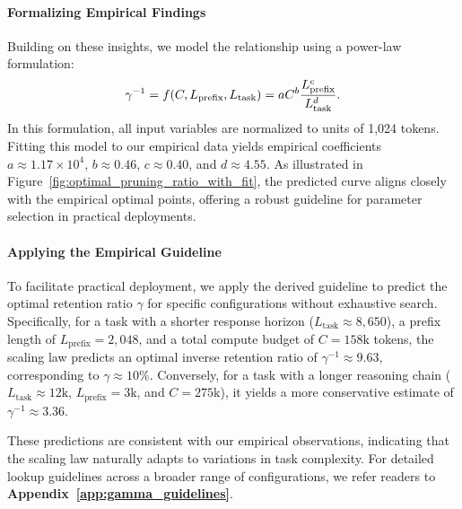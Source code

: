 \documentclass[11pt]{article}
\theoremstyle{plain}
\begin{document}
\paragraph{Formalizing Empirical Findings}
Building on these insights, we model the relationship using a power-law formulation:
\begin{equation}\small
    \gamma^{-1} = f(C, L_{\text{prefix}}, L_{\text{task}}) = aC^b\frac{L_\text{prefix}^c}{L_\text{task}^d}.
    \label{eq:optimial_gamma}
\end{equation}
In this formulation, all input variables are normalized to units of 1,024 tokens.
Fitting this model to our empirical data yields empirical coefficients $a \approx 1.17 \times 10^4$, $b \approx 0.46$, $c \approx 0.40$, and $d \approx 4.55$.
As illustrated in Figure~\ref{fig:optimal_pruning_ratio_with_fit}, the predicted curve aligns closely with the empirical optimal points, offering a robust guideline for parameter selection in practical deployments.

\paragraph{Applying the Empirical Guideline}
To facilitate practical deployment, we apply the derived guideline to predict the optimal retention ratio $\gamma$ for specific configurations without exhaustive search.
Specifically, for a task with a shorter response horizon ($L_{\text{task}} \approx 8{,}650$), a prefix length of $L_{\text{prefix}} = 2{,}048$, and a total compute budget of $C = 158\text{k}$ tokens, the scaling law predicts an optimal inverse retention ratio of $\gamma^{-1} \approx 9.63$, corresponding to $\gamma \approx 10\%$.
Conversely, for a task with a longer reasoning chain ($L_{\text{task}} \approx 12\text{k}$, $L_{\text{prefix}} = 3\text{k}$, and $C = 275\text{k}$), it yields a more conservative estimate of $\gamma^{-1} \approx 3.36$.

These predictions are consistent with our empirical observations, indicating that the scaling law naturally adapts to variations in task complexity.
For detailed lookup guidelines across a broader range of configurations, we refer readers to \textbf{Appendix~\ref{app:gamma_guidelines}}.
\end{document}
